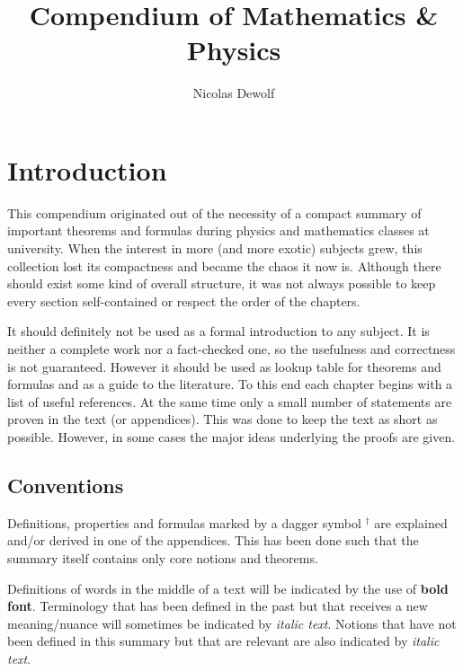 \documentclass[11pt, a4paper]{report}
\begin{document}
\reversemarginpar
\setcounter{tocdepth}{2}

\title{Compendium of Mathematics \& Physics}
\author{Nicolas Dewolf}
\maketitle

\tableofcontents

\chapter{Introduction}

This compendium originated out of the necessity of a compact summary of important theorems and formulas during physics and mathematics classes at university. When the interest in more (and more exotic) subjects grew, this collection lost its compactness and became the chaos it now is. Although there should exist some kind of overall structure, it was not always possible to keep every section self-contained or respect the order of the chapters.

It should definitely not be used as a formal introduction to any subject. It is neither a complete work nor a fact-checked one, so the usefulness and correctness is not guaranteed. However it should be used as lookup table for theorems and formulas and as a guide to the literature. To this end each chapter begins with a list of useful references. At the same time only a small number of statements are proven in the text (or appendices). This was done to keep the text as short as possible. However, in some cases the major ideas underlying the proofs are given.

\section{Conventions}

Definitions, properties and formulas marked by a dagger symbol $^\dag$ are explained and/or derived in one of the appendices. This has been done such that the summary itself contains only core notions and theorems.

Definitions of words in the middle of a text will be indicated by the use of \textbf{bold font}. Terminology that has been defined in the past but that receives a new meaning/nuance will sometimes be indicated by \textit{italic text}. Notions that have not been defined in this summary but that are relevant are also indicated by \textit{italic text}.
\end{document}
